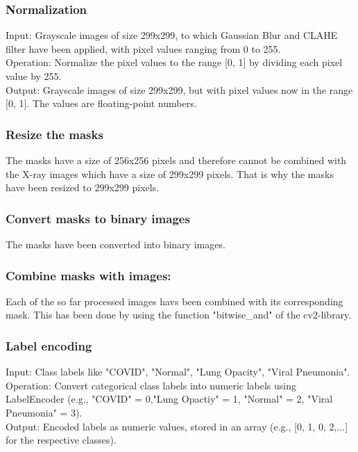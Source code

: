 \documentclass{article}
\begin{document}
\subsubsection{Normalization}
Input: Grayscale images of size 299x299, to which Gaussian Blur and CLAHE filter have been applied, with pixel values ranging from 0 to 255.\\
Operation: Normalize the pixel values to the range [0, 1] by dividing each pixel value by 255.\\
Output: Grayscale images of size 299x299, but with pixel values now in the range [0, 1]. The values are floating-point numbers.\\

\subsubsection{Resize the masks}
The masks have a size of 256x256 pixels and therefore cannot be combined with the X-ray images which have a size of 299x299 pixels. 
That is why the masks have been resized to 299x299 pixels.

\subsubsection{Convert masks to binary images}
The masks have been converted into binary images. 

\subsubsection{Combine masks with images:}
Each of the so far processed images havs been combined with its corresponding mask. This has been done by using the function "bitwise\_and" of the cv2-library.\\
   
\subsubsection{Label encoding}
Input: Class labels like "COVID", "Normal", "Lung Opacity", "Viral Pneumonia".\\
Operation: Convert categorical class labels into numeric labels using LabelEncoder (e.g., "COVID" = 0,"Lung Opactiy" = 1, "Normal" = 2, "Viral Pneumonia" = 3).\\
Output: Encoded labels as numeric values, stored in an array (e.g., [0, 1, 0, 2,...] for the respective classes).\\
\end{document}
